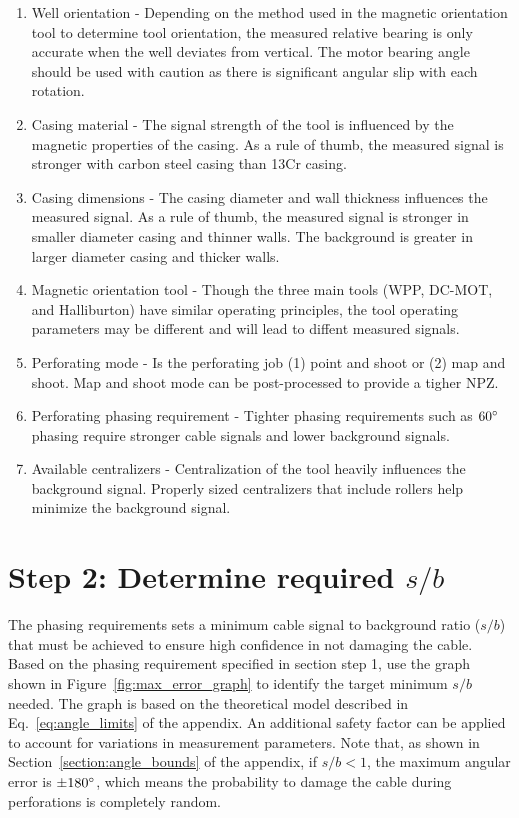 \documentclass[paper=a4, fontsize=11pt]{scrartcl}
\numberwithin{equation}{section}		%
\numberwithin{figure}{section}			%
\numberwithin{table}{section}				%
\begin{document}
\begin{enumerate}
	\item Well orientation - Depending on the method used in the magnetic orientation tool to determine tool orientation, the measured relative bearing is only accurate when the well deviates from vertical.  The motor bearing angle should be used with caution as there is significant angular slip with each rotation. 
	\item Casing material - The signal strength of the tool is influenced by the magnetic properties of the casing.  As a rule of thumb, the measured signal is stronger with carbon steel casing than 13Cr casing.
	\item Casing dimensions - The casing diameter and wall thickness influences the measured signal.  As a rule of thumb, the measured signal is stronger in smaller diameter casing and thinner walls.  The background is greater in larger diameter casing and thicker walls.
	\item Magnetic orientation tool - Though the three main tools (WPP, DC-MOT, and Halliburton) have similar operating principles, the tool operating parameters may be different and will lead to diffent measured signals.
	\item Perforating mode - Is the perforating job (1) point and shoot or (2) map and shoot.  Map and shoot mode can be post-processed to provide a tigher NPZ.
	\item Perforating phasing requirement - Tighter phasing requirements such as $60\degree$ phasing require stronger cable signals and lower background signals.  
	\item Available centralizers - Centralization of the tool heavily influences the background signal.  Properly sized centralizers that include rollers help minimize the background signal.  
\end{enumerate}

\section{Step 2: Determine required $s/b$} \label{section:required_sgbg}
The phasing requirements sets a minimum cable signal to background ratio ($s/b$) that must be achieved to ensure high confidence in not damaging the cable.  Based on the phasing requirement specified in section step 1, use the graph shown in Figure~\ref{fig:max_error_graph} to identify the target minimum $s/b$ needed.  The graph is based on the theoretical model described in Eq.~\ref{eq:angle_limits} of the appendix.  An additional safety factor can be applied to account for variations in measurement parameters.  Note that, as shown in Section~\ref{section:angle_bounds} of the appendix, if $s/b<1$, the maximum angular error is $\pm180\degree$, which means the probability to damage the cable during perforations is completely random.  
\end{document}
